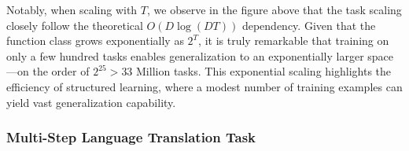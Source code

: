 Notably, when scaling with \( T \), we observe in the figure above that the task scaling closely follow the theoretical $O(D\log(DT))$ dependency. Given that the function class grows exponentially as \( 2^T \), it is truly remarkable that training on only a few hundred tasks enables generalization to an exponentially larger space—on the order of \( 2^{25} > 33 \) Million tasks. This exponential scaling highlights the efficiency of structured learning, where a modest number of training examples can yield vast generalization capability.





 








    


\subsubsection{Multi-Step Language Translation Task}


